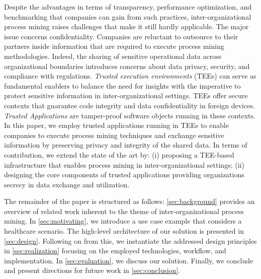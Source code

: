 Despite the advantages in terms of transparency, performance optimization, and benchmarking that companies can gain from such practices, inter-organizational process mining raises challenges that make it still hardly applicable. The major issue concerns confidentiality. Companies are reluctant to outsource to their partners inside information that are required to execute process mining methodologies. Indeed, the sharing of sensitive operational data across organizational boundaries introduces concerns about data privacy, security, and compliance with regulations. \textit{Trusted execution environments} (TEEs) can serve as fundamental enablers to balance the need for insights with the imperative to protect sensitive information in inter-organizational settings. TEEs offer secure contexts that guarantee code integrity and data confidentiality in foreign devices. \textit{Trusted Applications} are tamper-proof software objects running in these contexts. In this paper, we employ trusted applications running in TEEs to enable companies to execute process mining techniques and exchange sensitive information by preserving privacy and integrity of the shared data. In terms of contribution, we extend the state of the art by: (i) proposing a TEE-based infrastructure that enables process mining in inter-organizational settings; (ii) designing the core components of trusted applications providing organizations secrecy in data exchange and utilization.

The remainder of the paper is structured as follows: \cref{sec:background} provides an overview of related work inherent to the theme of inter-organizational process mining. In \cref{sec:motivating}, we introduce a use case example that considers a healthcare scenario. The high-level architecture of our solution is presented in \cref{sec:design}. Following on from this, we instantiate the addressed design principles in \cref{sec:realization} focusing on the employed technologies, workflow, and implementation. In \cref{sec:evaluation}, we discuss our solution. Finally, we conclude and present directions for future work in \cref{sec:conclusion}.
